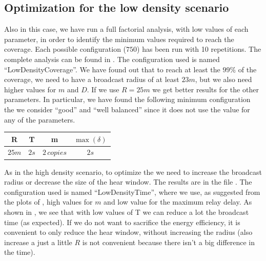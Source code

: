\subsection{Optimization for the low density
scenario}\label{subsec:ldoptimization}

Also in this case, we have run a full factorial analysis, with low values of
each parameter, in order to identify the minimum values required to reach the
coverage. Each possible configuration (\(750\)) has been run with 10
repetitions. The complete analysis can be found in . The
configuration used is named ``LowDensityCoverage''. We have found out that to
reach at least the \(99\%\) of the coverage, we need to have a broadcast radius
of at least \(23m\), but we also need higher values for \(m\) and \(D\). If we
use \(R\!=\!25m\) we get better results for the other parameters. In particular,
we have found the following minimum configuration the we consider ``good'' and
``well balanced'' since it does not use the value  for any of the
parameters.

\begin{center}
	\begin{tabular}{cccc}
		\toprule
		R & T & m & \(\max(\delta)\) \\
		\midrule
		\(25m\) & \(2s\) & \(2\,\mathit{copies}\) & \(2s\) \\
		\bottomrule
	\end{tabular}
\end{center}

As in the high density scenario, to optimize the 
we need to increase the broadcast radius or decrease the size of the hear
window. The results are in the file . The
configuration used is named ``LowDensityTime'', where we use, as suggested from
the plots of , high values for \(m\) and low value for the
maximum relay delay. As shown in , we see that with low
values of T we can reduce a lot the broadcast time (as expected). If we do not
want to sacrifice the energy efficiency, it is convenient to only reduce the
hear window, without increasing the radius (also increase a just a little \(R\)
is not convenient because there isn't a big difference in the time).

